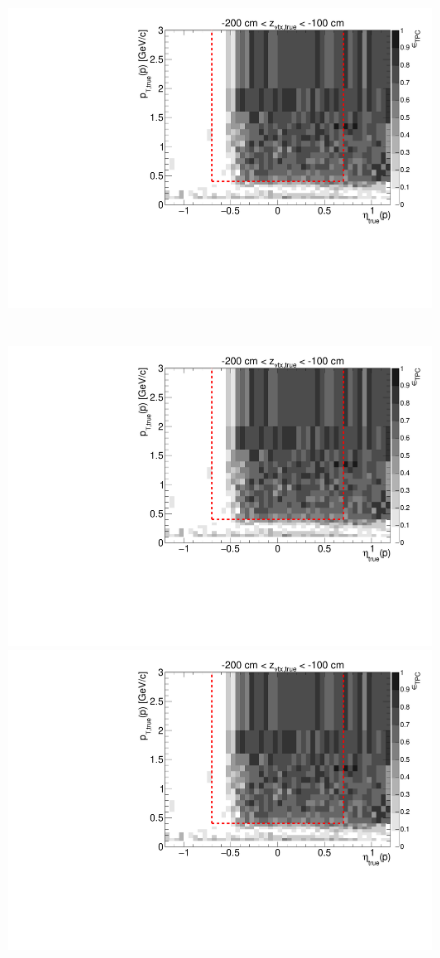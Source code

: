 \begin{figure}[hb]
{  \includegraphics[width=\linewidth,page=17]{graphics/eff/Eff2D_TPC_proton_Minus.pdf}
}~
\parbox{0.495\textwidth}{
  \centering
  \includegraphics[width=\linewidth,page=12]{graphics/eff/Eff2D_TPC_proton_Minus.pdf}\\
  \includegraphics[width=\linewidth,page=14]{graphics/eff/Eff2D_TPC_proton_Minus.pdf}\\
}
\end{figure}

